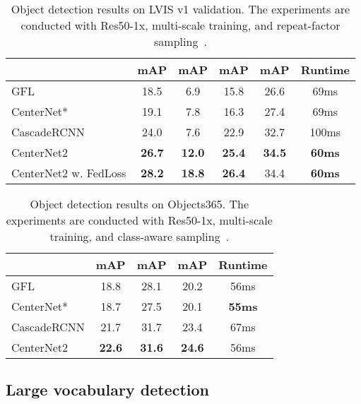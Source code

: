 \documentclass{article}
\newcommand{\name}{CenterNet2 }
\begin{document}
\begin{table}[!t]
\centering
\begin{tabular}{@{}l@{}c@{\ }c@{\ }c@{\ }c@{\ }c@{}}
\toprule
& mAP & mAP & mAP & mAP & Runtime \\
\midrule
GFL{~\cite{li2020generalized}} & 18.5 & 6.9 & 15.8 & 26.6 & 69ms \\
CenterNet* & 19.1 & 7.8 & 16.3 & 27.4 & 69ms \\
CascadeRCNN & 24.0  & 7.6 & 22.9  & 32.7 & 100ms\\
\name & \bf 26.7  & \bf 12.0  & \bf 25.4 & \bf 34.5 & \textbf{60ms}\\
\midrule
\name w. FedLoss & \bf 28.2  & \bf 18.8  & \bf 26.4 & 34.4 & \textbf{60ms}\\
\bottomrule
\end{tabular}
\normalsize
\vspace{-2mm}
\caption{Object detection results on LVIS v1 validation. The experiments are conducted with Res50-1x, multi-scale training, and repeat-factor sampling~\cite{gupta2019lvis}. 
}
\vspace{-5mm}
\label{table:lvis}
\end{table}


\begin{table}[!t]
\centering
\begin{tabular}{@{}l@{\ \ }c@{\ \ }c@{\ \ }c@{\ \ }c@{}}
\toprule
& mAP & mAP & mAP & Runtime \\
\midrule
GFL~\cite{li2020generalized} & 18.8 & 28.1 & 20.2 & 56ms \\
CenterNet* & 18.7 & 27.5 & 20.1 & \textbf{55ms} \\
CascadeRCNN & 21.7  & 31.7 & 23.4 & 67ms \\
\name & \textbf{22.6} & \textbf{31.6}  & \textbf{24.6} & 56ms \\
\bottomrule
\end{tabular}
\normalsize
\vspace{-2mm}
\caption{Object detection results on Objects365. The experiments are conducted with Res50-1x, multi-scale training, and class-aware sampling~\cite{shen2016relay}. 
}
\vspace{-6mm}
\label{table:objects365}
\end{table}


\subsection{Large vocabulary detection}
\label{sec:large_vocabulary}
\end{document}
